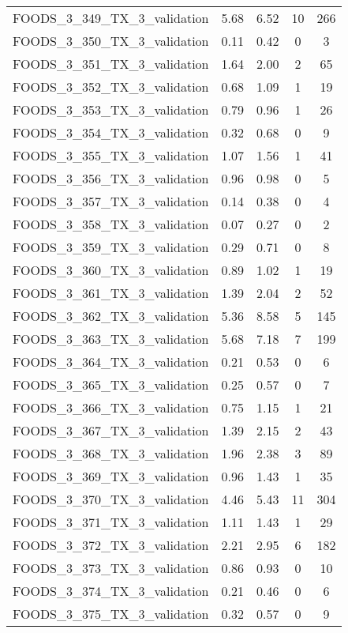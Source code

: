 \begin{table}
\begin{tabular}{|l|c|c|c|c|}
FOODS\_3\_349\_TX\_3\_validation & 5.68 & 6.52 & 10 & 266 \\
FOODS\_3\_350\_TX\_3\_validation & 0.11 & 0.42 & 0 & 3 \\
FOODS\_3\_351\_TX\_3\_validation & 1.64 & 2.00 & 2 & 65 \\
FOODS\_3\_352\_TX\_3\_validation & 0.68 & 1.09 & 1 & 19 \\
FOODS\_3\_353\_TX\_3\_validation & 0.79 & 0.96 & 1 & 26 \\
FOODS\_3\_354\_TX\_3\_validation & 0.32 & 0.68 & 0 & 9 \\
FOODS\_3\_355\_TX\_3\_validation & 1.07 & 1.56 & 1 & 41 \\
FOODS\_3\_356\_TX\_3\_validation & 0.96 & 0.98 & 0 & 5 \\
FOODS\_3\_357\_TX\_3\_validation & 0.14 & 0.38 & 0 & 4 \\
FOODS\_3\_358\_TX\_3\_validation & 0.07 & 0.27 & 0 & 2 \\
FOODS\_3\_359\_TX\_3\_validation & 0.29 & 0.71 & 0 & 8 \\
FOODS\_3\_360\_TX\_3\_validation & 0.89 & 1.02 & 1 & 19 \\
FOODS\_3\_361\_TX\_3\_validation & 1.39 & 2.04 & 2 & 52 \\
FOODS\_3\_362\_TX\_3\_validation & 5.36 & 8.58 & 5 & 145 \\
FOODS\_3\_363\_TX\_3\_validation & 5.68 & 7.18 & 7 & 199 \\
FOODS\_3\_364\_TX\_3\_validation & 0.21 & 0.53 & 0 & 6 \\
FOODS\_3\_365\_TX\_3\_validation & 0.25 & 0.57 & 0 & 7 \\
FOODS\_3\_366\_TX\_3\_validation & 0.75 & 1.15 & 1 & 21 \\
FOODS\_3\_367\_TX\_3\_validation & 1.39 & 2.15 & 2 & 43 \\
FOODS\_3\_368\_TX\_3\_validation & 1.96 & 2.38 & 3 & 89 \\
FOODS\_3\_369\_TX\_3\_validation & 0.96 & 1.43 & 1 & 35 \\
FOODS\_3\_370\_TX\_3\_validation & 4.46 & 5.43 & 11 & 304 \\
FOODS\_3\_371\_TX\_3\_validation & 1.11 & 1.43 & 1 & 29 \\
FOODS\_3\_372\_TX\_3\_validation & 2.21 & 2.95 & 6 & 182 \\
FOODS\_3\_373\_TX\_3\_validation & 0.86 & 0.93 & 0 & 10 \\
FOODS\_3\_374\_TX\_3\_validation & 0.21 & 0.46 & 0 & 6 \\
FOODS\_3\_375\_TX\_3\_validation & 0.32 & 0.57 & 0 & 9 \\

\end{tabular}
\end{table}

